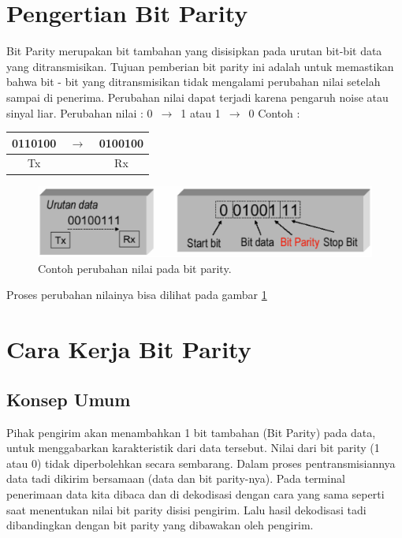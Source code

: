 
\section{Pengertian Bit Parity}
Bit Parity merupakan bit tambahan yang disisipkan pada urutan bit-bit data yang ditransmisikan.
Tujuan pemberian bit parity ini adalah untuk memastikan bahwa bit - bit yang ditransmisikan tidak mengalami perubahan nilai setelah sampai di penerima.
Perubahan nilai dapat terjadi karena pengaruh noise atau sinyal liar.
Perubahan nilai : 0 $\,\to\,$ 1 atau 1 $\,\to\,$ 0
\newline Contoh :

\begin{table}[h!]
\centering
\begin{tabular}{ c c c }
0110100 & $\,\to\,$ &  0100100\\
\hline
Tx &  & Rx \\
\end{tabular}
\end{table}

\begin{figure}[ht]
\centerline{\includegraphics[width=1\textwidth]{figures/perubahan_nilai_bit_parity.png}}
\caption{Contoh perubahan nilai pada bit parity.}
\label{perubahan_nilai_bit_parity}
\end{figure}

Proses perubahan nilainya bisa dilihat pada gambar \ref{perubahan_nilai_bit_parity}

\section{Cara Kerja Bit Parity}
\subsection{Konsep Umum}
Pihak pengirim akan menambahkan 1 bit tambahan (Bit Parity) pada data, untuk menggabarkan karakteristik dari data tersebut. Nilai dari bit parity (1 atau 0) tidak diperbolehkan secara sembarang. Dalam proses pentransmisiannya data tadi dikirim bersamaan (data dan bit parity-nya). Pada terminal penerimaan data kita dibaca dan di dekodisasi dengan cara yang sama seperti saat menentukan nilai bit parity disisi pengirim. Lalu hasil dekodisasi tadi dibandingkan dengan bit parity yang dibawakan oleh pengirim.

